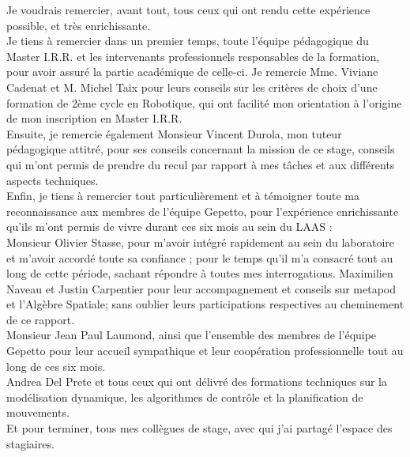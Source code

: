 \documentclass{report}
\begin{document}
Je voudrais remercier, avant tout, tous ceux qui ont rendu cette expérience possible, et très enrichissante.\\
Je tiens à remercier dans un premier temps, toute l’équipe pédagogique du Master I.R.R. et les intervenants professionnels responsables de la formation, pour avoir assuré la partie académique de celle-ci. Je remercie Mme. Viviane Cadenat et M. Michel Taix pour leurs conseils sur les critères de choix d'une formation de 2ème cycle en Robotique, qui ont facilité mon orientation à l'origine de mon inscription en Master I.R.R.\\
Ensuite, je remercie également Monsieur Vincent Durola, mon tuteur pédagogique attitré, pour ses conseils concernant la mission de ce stage, conseils qui m'ont permis de prendre du recul par rapport à mes tâches et aux différents aspects techniques.\\
Enfin, je tiens à remercier tout particulièrement et à témoigner toute ma reconnaissance aux membres de l'équipe Gepetto, pour l’expérience enrichissante qu’ils m’ont permis de vivre durant ces six mois au sein du LAAS :\\
Monsieur Olivier Stasse, pour m’avoir intégré rapidement au sein du laboratoire et m’avoir accordé toute sa confiance ; pour le temps qu’il m’a consacré tout au long de cette période, sachant répondre à toutes mes interrogations. Maximilien Naveau et Justin Carpentier pour leur accompagnement et conseils sur metapod et l'Algèbre Spatiale; sans oublier leurs participations respectives au cheminement de ce rapport.\\
Monsieur Jean Paul Laumond, ainsi que l’ensemble des membres de l'équipe Gepetto pour leur accueil sympathique et leur coopération professionnelle tout au long de ces six mois.\\
Andrea Del Prete et tous ceux qui ont délivré des formations techniques sur la modélisation dynamique, les algorithmes de contrôle et la planification de mouvements.\\
Et pour terminer, tous mes collègues de stage, avec qui j'ai partagé l'espace des stagiaires.
\vspace{0.3cm} %





\glsaddall
\printglossaries

\end{document}
